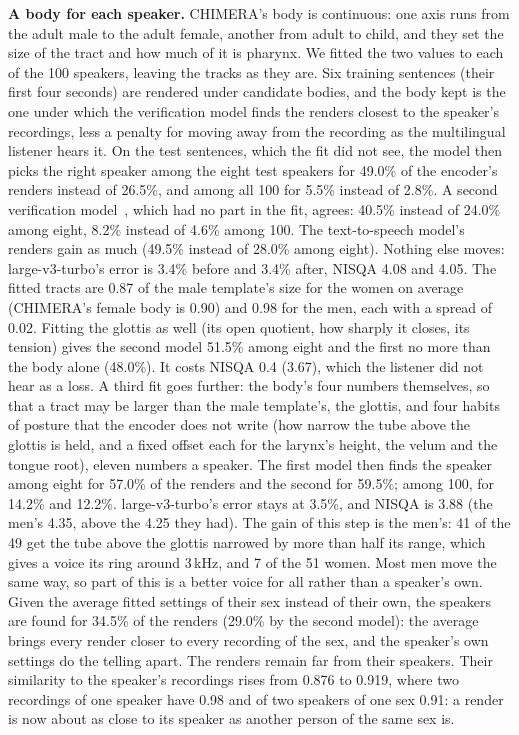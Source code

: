 \documentclass[10pt,a4paper,twocolumn]{article}
\begin{document}
\textbf{A body for each speaker.} CHIMERA's body is continuous: one axis runs from the adult male
to the adult female, another from adult to child, and they set the size of the tract and how much
of it is pharynx. We fitted the two values to each of the 100 speakers, leaving the tracks as they
are. Six training sentences (their first four seconds) are rendered under candidate bodies, and
the body kept is the one under which the verification model finds the renders closest to the
speaker's recordings, less a penalty for moving away from the recording as the multilingual
listener hears it. On the test sentences, which the fit did not see, the model then picks the
right speaker among the eight test speakers for 49.0\% of the encoder's renders instead of
26.5\%, and among all 100 for 5.5\% instead of 2.8\%. A second verification
model~\cite{unispeechsat}, which had no part in the fit, agrees: 40.5\% instead of
24.0\% among eight, 8.2\% instead of 4.6\% among 100. The text-to-speech
model's renders gain as much (49.5\% instead of 28.0\% among eight). Nothing else moves:
large-v3-turbo's error is 3.4\% before and 3.4\% after, NISQA 4.08 and 4.05. The
fitted tracts are 0.87 of the male template's size for the women on average (CHIMERA's female
body is 0.90) and 0.98 for the men, each with a spread of 0.02. Fitting the
glottis as well (its open quotient, how sharply it closes, its tension) gives the second model
51.5\% among eight and the first no more than the body alone (48.0\%). It costs NISQA 0.4
(3.67), which the listener did not hear as a loss. A third fit goes further: the body's four
numbers themselves, so that a tract may be larger than the male template's, the glottis, and
four habits of posture that the encoder does not write (how narrow the tube above the glottis
is held, and a fixed offset each for the larynx's height, the velum and the tongue root),
eleven numbers a speaker. The first model then finds the speaker among eight for 57.0\% of
the renders and the second for 59.5\%; among 100, for 14.2\% and 12.2\%.
large-v3-turbo's error stays at 3.5\%, and NISQA is 3.88 (the men's 4.35, above the
4.25 they had). The gain of this step is the men's: 41 of the 49 get the tube above the
glottis narrowed by more than half its range, which gives a voice its ring around 3\,kHz, and
7 of the 51 women. Most men move the same way, so part of this is a better
voice for all rather than a speaker's own. Given the average fitted settings of their sex
instead of their own, the speakers are found for 34.5\% of the renders (29.0\% by the
second model): the average brings every render closer to every recording of the sex, and the
speaker's own settings do the telling apart. The renders remain far from their speakers. Their similarity
to the speaker's recordings rises from 0.876 to 0.919, where two recordings of one
speaker have 0.98 and of two speakers of one sex 0.91: a render is now about as close to its
speaker as another person of the same sex is.
\end{document}
